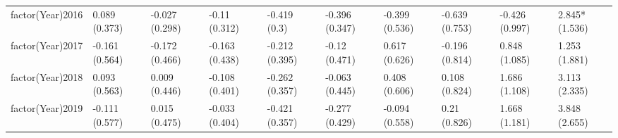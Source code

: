 \begin{table}[ht]
\begin{tabular}{llllllllll}
  factor(Year)2016 & 0.089 (0.373) & -0.027 (0.298) & -0.11 (0.312) & -0.419 (0.3) & -0.396 (0.347) & -0.399 (0.536) & -0.639 (0.753) & -0.426 (0.997) & 2.845* (1.536) \\ 
  factor(Year)2017 & -0.161 (0.564) & -0.172 (0.466) & -0.163 (0.438) & -0.212 (0.395) & -0.12 (0.471) & 0.617 (0.626) & -0.196 (0.814) & 0.848 (1.085) & 1.253 (1.881) \\ 
  factor(Year)2018 & 0.093 (0.563) & 0.009 (0.446) & -0.108 (0.401) & -0.262 (0.357) & -0.063 (0.445) & 0.408 (0.606) & 0.108 (0.824) & 1.686 (1.108) & 3.113 (2.335) \\ 
  factor(Year)2019 & -0.111 (0.577) & 0.015 (0.475) & -0.033 (0.404) & -0.421 (0.357) & -0.277 (0.429) & -0.094 (0.558) & 0.21 (0.826) & 1.668 (1.181) & 3.848 (2.655) \\ 
   \bottomrule
\end{tabular}
\endgroup
\end{table}
